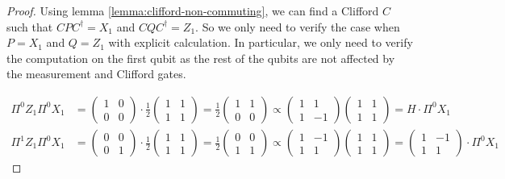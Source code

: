 \begin{proof}
	Using lemma \ref{lemma:clifford-non-commuting}, we can find a Clifford $C$ such that $C P C^\dagger = X_1$ and $C Q C^\dagger = Z_1$. So we only need to verify the case when $P = X_1$ and $Q = Z_1$ with explicit calculation.
	In particular, we only need to verify the computation on the first qubit as the rest of the qubits are not affected by the measurement and Clifford gates.

	\begin{align*}
		\Pi^0 Z_1 \Pi^0 X_1 &= 
		\begin{pmatrix} 1 & 0 \\ 0 & 0 \end{pmatrix} 
		\cdot 
		\frac{1}{2} \begin{pmatrix} 1 & 1 \\ 1 & 1 \end{pmatrix}
		=
		\frac{1}{2} \begin{pmatrix} 1 & 1 \\ 0 & 0 \end{pmatrix}	
		\propto
		\begin{pmatrix} 1 & 1 \\ 1 & -1 \end{pmatrix} 
		\begin{pmatrix} 1 & 1 \\ 1 & 1	\end{pmatrix}
		= H \cdot \Pi^0 X_1
	\end{align*}
	\begin{align*}
		\Pi^1 Z_1 \Pi^0 X_1 &= 
		\begin{pmatrix} 0 & 0 \\ 0 & 1 \end{pmatrix} 
		\cdot 
		\frac{1}{2} \begin{pmatrix} 1 & 1 \\ 1 & 1 \end{pmatrix}
		=
		\frac{1}{2} \begin{pmatrix} 0 & 0 \\ 1 & 1 \end{pmatrix}	
		\propto
		\begin{pmatrix} 1 & -1 \\ 1 & 1 \end{pmatrix} 
		\begin{pmatrix} 1 & 1 \\ 1 & 1	\end{pmatrix}
		=  \begin{pmatrix} 1 & -1 \\ 1 & 1 \end{pmatrix} \cdot \Pi^0 X_1

\end{align*}
\end{proof}
